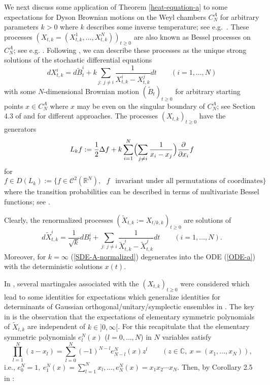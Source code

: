 \documentclass[reqno]{amsart}
\def\cal{\mathcal }
\theoremstyle{plain}
\theoremstyle{definition}
\numberwithin{equation}{section}
\begin{document}
We next discuss some application of Theorem \ref{heat-equation-a} to  some expectations for Dyson Brownian motions
on the Weyl chambers $C_N^A$ for arbitrary parameters $k>0$ where $k$ describes some inverse temperature; see e.g.~\cite{AGZ}.
These processes $(X_{t,k}=(X_{t,k}^1,\ldots, X_{t,k}^N))_{t\ge0}$ are also known as Bessel processes on $C_N^A$; see e.g. \cite{CGY, RV1, V3}.
Following \cite{AGZ,  CGY}, we  can describe these processes as the unique strong solutions of the stochastic differential equations 
\begin{equation}\label{SDE-A}
 dX_{t,k}^i = d\tilde B_t^i+ k\sum_{j: \> j\ne i} \frac{1}{X_{t,k}^i-X_{t,k}^j}dt \quad\quad(i=1,\ldots,N)
\end{equation}
with some $N$-dimensional Brownian motion $(\tilde B_t)_{t\ge0}$ for arbitrary starting points $x\in C_N^A$ where 
 $x$ may be even on the singular boundary of $C_N^A$; see  Section 4.3 of \cite{AGZ} and \cite{CL, GM, CGY} for different approaches. 
The processes $(X_{t,k})_{t\ge0}$ have  the generators 
 \begin{equation}\label{generator-hermite-intro}
     L_kf:= \frac{1}{2} \Delta f +
 k \sum_{i=1}^N\Bigl( \sum_{j\ne i} \frac{1}{x_i-x_j}\Bigr) \frac{\partial}{\partial x_i}f 
 \end{equation}
 for
 $$f\in D(L_k):=\{f\in \cal C^{2}(\mathbb R^N), 
 \>\>\> f\>\>\text{ invariant under all permutations of coordinates}\}$$
 where the transition probabilities can be described in terms of multivariate Bessel functions; see \cite{R1, R2,  RV1, V3}.

 Clearly, the  renormalized processes $(\tilde X_{t,k}:=X_{t/k,k})_{t\ge0}$ are solutions of
\begin{equation}\label{SDE-A-normalized}
d\tilde X_{t,k}^i =\frac{1}{\sqrt k}dB_t^i + \sum_{j: \> j\ne i} 
 \frac{1}{\tilde X_{t,k}^i-\tilde X_{t,k}^j}dt\quad\quad(i=1,\ldots,N). 
\end{equation}
Moreover, for  $k=\infty$   (\ref{SDE-A-normalized}) degenerates into the ODE (\ref{ODE-a}) with the deterministic solutions $x(t)$.

In \cite{KVW}, several  martingales associated with the  $(X_{t,k})_{t\ge0}$
were considered which lead to some identities for expectations which generalize identities
for determinants of Gaussian orthogonal/unitary/symplectic ensembles in \cite{DG, FG}. The key in  \cite{KVW} is the observation that the expectations
of elementary symmetric polynomials  of $\tilde X_{t,k}$ are independent of $k\in]0,\infty[$. For this recapitulate
that  the elementary
symmetric polynomials $e_l^N(x)$ ($ l=0,\ldots,N$) in $N$ variables satisfy
\begin{equation}\label{symmetric-poly}
\prod_{l=1}^N (z-x_l) = \sum_{l=0}^{N}(-1)^{N-l}  e^N_{N-l}(x) z^l \quad\quad
(z\in\mathbb C, \> x=(x_1,\ldots,x_N)),
\end{equation}
i.e.,
$e_0^N=1, \> e_1^N(x)=\sum_{l=1}^N x_l , \ldots, e_N^N(x)=x_1x_2\cdots x_N$. Then, by Corollary 2.5 in \cite{KVW}:
\end{document}
